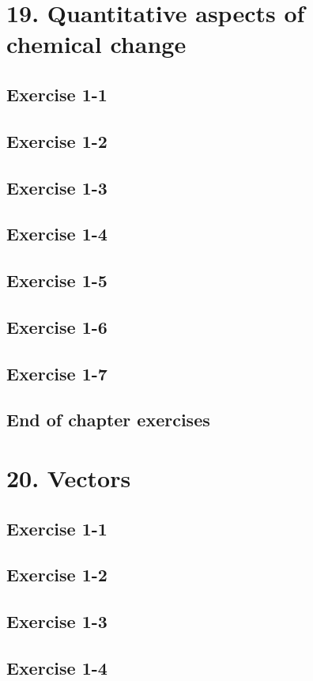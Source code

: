 \section{19. Quantitative aspects of chemical change}
\subsection{Exercise 1-1}
\subsection{Exercise 1-2}
\subsection{Exercise 1-3}
\subsection{Exercise 1-4}
\subsection{Exercise 1-5}
\subsection{Exercise 1-6}
\subsection{Exercise 1-7}
\subsection{End of chapter exercises}
\section{20. Vectors}
\subsection{Exercise 1-1}
\subsection{Exercise 1-2}
\subsection{Exercise 1-3}
\subsection{Exercise 1-4}
